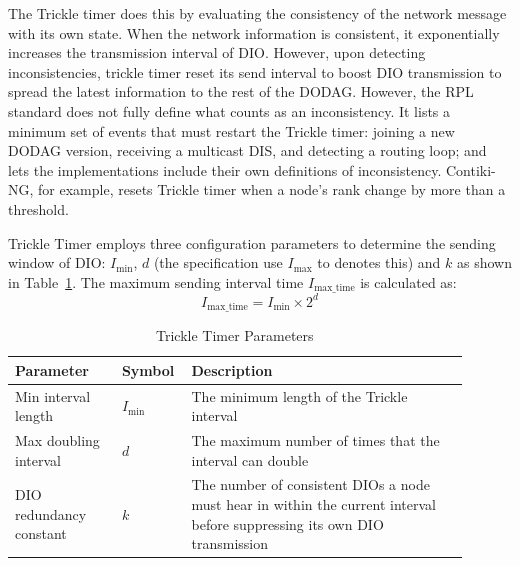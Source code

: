 The Trickle timer does this by evaluating the consistency of the
network message with its own state.
When the network information is consistent, it
exponentially increases the transmission interval of DIO. However,
upon detecting inconsistencies, trickle timer reset its send interval
to boost DIO transmission to spread the latest information to the
rest of the DODAG.
However, the RPL standard does not fully define what counts as an
inconsistency.
It lists a minimum set of events that must restart the
Trickle timer: joining a new DODAG version, receiving a multicast
DIS, and detecting a routing loop; and lets the implementations include
their own definitions of inconsistency. Contiki-NG, for example,
resets Trickle timer when a node's rank change by more than a threshold.

Trickle Timer employs three configuration
parameters to determine the sending window of DIO: $I_{\mathrm{min}}$,
$d$ (the specification use $I_{\mathrm{max}}$ to denotes this) and
$k$ as shown in Table~\ref{tab:tricker_timer_params}.
The maximum sending interval time
$I_{\mathrm{max\_time}}$ is calculated as:
\begin{equation}
    I_{\mathrm{max\_time}} = I_{\mathrm{min}} \times 2^{d}
\end{equation}

\begin{table}
    \caption{Trickle Timer Parameters}\label{tab:tricker_timer_params}
    \begin{center}
        \begin{tabular}[c]{@{}p{0.22\linewidth}p{0.10\linewidth}p{0.58\linewidth}@{}}
            \hline
            \textbf{Parameter} & \textbf{Symbol} & \textbf{Description} \\
            \hline
            Min interval length & $I_{\mathrm{min}}$ & The minimum
            length of the Trickle interval \\
            Max doubling interval & $d$  & The maximum number of
            times that the interval can double \\
            DIO redundancy constant & $k$ & The number of consistent
            DIOs a node must hear in within the current interval
            before suppressing its own DIO transmission \\
            \hline
        \end{tabular}
    \end{center}
\end{table}

